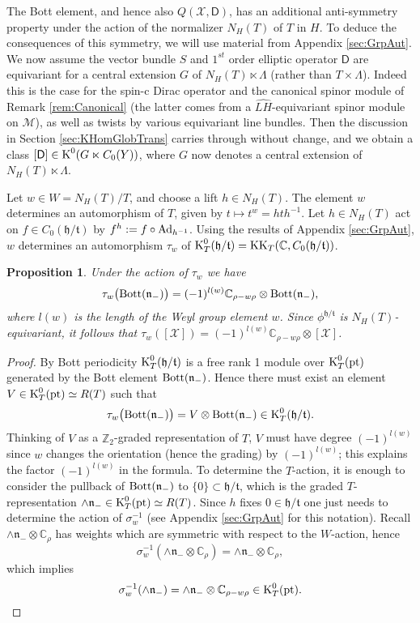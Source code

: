 \documentclass[11pt,reqno]{amsart}
\newtheorem{proposition}[theorem]{Proposition}
\theoremstyle{definition}
\theoremstyle{remark}
\newcommand{\wh}[1]{\widehat{#1}}
\newcommand{\st}[1]{\mathsf{#1}}
\def\Ad{\ensuremath{\textnormal{Ad}}}
\def\t{\ensuremath{\mathfrak{t}}}
\def\h{\ensuremath{\mathfrak{h}}}
\def\n{\ensuremath{\mathfrak{n}}}
\def\K{\ensuremath{\mathcal{K}}}
\def\X{\ensuremath{\mathcal{X}}}
\def\M{\ensuremath{\mathcal{M}}}
\def\bC{\ensuremath{\mathbb{C}}}
\def\bZ{\ensuremath{\mathbb{Z}}}
\def\KK{\ensuremath{\textnormal{KK}}}
\def\pt{\ensuremath{\textnormal{pt}}}
\def\K{\ensuremath{\textnormal{K}}}
\def\Bott{\ensuremath{\textnormal{Bott}}}
\begin{document}
The Bott element, and hence also $Q(\X,\st{D})$, has an additional anti-symmetry property under the action of the normalizer $N_H(T)$ of $T$ in $H$.  To deduce the consequences of this symmetry, we will use material from Appendix \ref{sec:GrpAut}.  We now assume the vector bundle $S$ and $1^{st}$ order elliptic operator $\st{D}$ are equivariant for a central extension $G$ of $N_H(T)\ltimes \Lambda$ (rather than $T \times \Lambda$).  Indeed this is the case for the spin-c Dirac operator and the canonical spinor module of Remark \ref{rem:Canonical} (the latter comes from a $\wh{LH}$-equivariant spinor module on $\M$), as well as twists by various equivariant line bundles.  Then the discussion in Section \ref{sec:KHomGlobTrans} carries through without change, and we obtain a class $[\st{D}] \in \K^0(G\ltimes C_0(Y))$, where $G$ now denotes a central extension of $N_H(T)\ltimes \Lambda$.

Let $w \in W=N_H(T)/T$, and choose a lift $h \in N_H(T)$.  The element $w$ determines an automorphism of $T$, given by $t \mapsto t^w=hth^{-1}$.  Let $h \in N_H(T)$ act on $f \in C_0(\h/\t)$ by $f^h:=f\circ \Ad_{h^{-1}}$.  Using the results of Appendix \ref{sec:GrpAut}, $w$ determines an automorphism $\tau_w$ of $\K^0_T(\h/\t)=\KK_T(\bC,C_0(\h/\t))$.

\begin{proposition}
\label{prop:BottWeyl}
Under the action of $\tau_w$ we have
\[ \tau_w\big(\Bott(\n_-)\big)=(-1)^{l(w)}\bC_{\rho-w\rho}\otimes \Bott(\n_-),\]
where $l(w)$ is the length of the Weyl group element $w$.  Since $\phi^{\h/\t}$ is $N_H(T)$-equivariant, it follows that $\tau_w([\X])=(-1)^{l(w)}\bC_{\rho-w\rho}\otimes [\X]$.
\end{proposition}
\begin{proof}
By Bott periodicity $\K^0_T(\h/\t)$ is a free rank 1 module over $\K^0_T(\pt)$ generated by the Bott element $\Bott(\n_-)$.  Hence there must exist an element $V \in \K^0_T(\pt)\simeq R(T)$ such that
\[ \tau_w\big(\Bott(\n_-)\big)=V \otimes \Bott(\n_-) \in \K^0_T(\h/\t).\]
Thinking of $V$ as a $\bZ_2$-graded representation of $T$, $V$ must have degree $(-1)^{l(w)}$ since $w$ changes the orientation (hence the grading) by $(-1)^{l(w)}$; this explains the factor $(-1)^{l(w)}$ in the formula.  To determine the $T$-action, it is enough to consider the pullback of $\Bott(\n_-)$ to $\{0 \} \subset \h/\t$, which is the graded $T$-representation $\wedge \n_- \in \K^0_T(\pt)\simeq R(T)$.  Since $h$ fixes $0 \in \h/\t$ one just needs to determine the action of $\sigma_w^{-1}$ (see Appendix \ref{sec:GrpAut} for this notation).  Recall $\wedge \n_- \otimes \bC_\rho$ has weights which are symmetric with respect to the $W$-action, hence
\[ \sigma_w^{-1}(\wedge \n_- \otimes \bC_\rho)=\wedge \n_- \otimes \bC_\rho,\]
which implies
\[ \sigma_w^{-1}(\wedge \n_-)=\wedge \n_- \otimes \bC_{\rho-w\rho} \in \K^0_T(\pt).\]
\end{proof}
\end{document}

